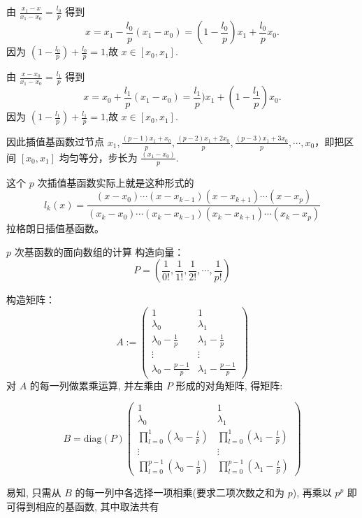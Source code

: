 \documentclass{article}
\begin{document}
由 $\frac{x_1 - x}{x_1 - x_0}=\frac{l_0}{p}$ 得到
$$
x=x_1-\frac{l_0}{p} (x_1 - x_0)=(1-\frac{l_0}{p})x_1 + \frac{l_0}{p} x_0.
$$
因为 $(1-\frac{l_0}{p}) + \frac{l_0}{p} =1$,故 $x\in [x_0,x_1].$

由 $\frac{x - x_0}{x_1 - x_0}=\frac{l_1}{p}$ 得到
$$
x=x_0+\frac{l_1}{p} (x_1 - x_0)=\frac{l_1}{p})x_1 + (1-\frac{l_1}{p})x_0.
$$
因为 $(1-\frac{l_1}{p}) + \frac{l_1}{p} = 1$,故 $x\in [x_0,x_1].$

因此插值基函数过节点 $x_1,\frac{(p-1)x_1 + x_0}{p},\frac{(p-2)x_1 + 2x_0}{p},\frac{(p-3)x_1 + 3x_0}{p},\cdots,x_0$，即把区间 $[x_0,x_1]$ 均匀等分，步长为 $\frac{(x_1-x_0)}{p}$.

这个 $p$ 次插值基函数实际上就是这种形式的
$$
l_k(x)=\frac{(x-x_0)\cdots(x-x_{k-1})(x-x_{k+1})\cdots(x - x_p)}{(x_k-x_0)\cdots(x_k-x_{k-1})(x_k-x_{k+1})\cdots(x_k-x_p)}
$$
拉格朗日插值基函数。

$p$ 次基函数的面向数组的计算
构造向量：
$$
P = ( \frac{1}{0!},  \frac{1}{1!}, \frac{1}{2!}, \cdots, \frac{1}{p!})
$$

构造矩阵：
$$
A :=                                                                            
\begin{pmatrix}  
1  &  1  \\
\lambda_0 & \lambda_1\\                                             
\lambda_0 - \frac{1}{p} & \lambda_1 - \frac{1}{p}\\   
\vdots & \vdots \\                                                     
\lambda_0 - \frac{p - 1}{p} & \lambda_1 - \frac{p - 1}{p}
\end{pmatrix}                                                                   
$$ 
对 $A$ 的每一列做累乘运算, 并左乘由 $P$ 形成的对角矩阵, 得矩阵:

$$
B = \mathrm{diag}(P)
\begin{pmatrix}
1 & 1\\
\lambda_0 & \lambda_1\\
\prod_{l=0}^{1}(\lambda_0 - \frac{l}{p}) & \prod_{l=0}^{1}(\lambda_1 - \frac{l}{p})\\
\vdots & \vdots \\
\prod_{l=0}^{p-1}(\lambda_0 - \frac{l}{p}) & \prod_{l=0}^{p-1}(\lambda_1 - \frac{l}{p}) 
\end{pmatrix}
$$

易知, 只需从 $B$ 的每一列中各选择一项相乘(要求二项次数之和为 $p$), 再乘以 $p^p$ 即可得到相应的基函数, 其中取法共有 
\end{document}
